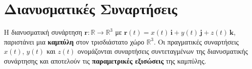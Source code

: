 



\geometry{left=15.63mm,right=15.63mm,top=30.25mm, bottom=36.25mm,footskip=24.16mm,
  headsep=24.16mm}

\pagestyle{vangelis}
\everymath{\displaystyle}

\newcommand{\twocolumnsidescc}[2]{\begin{minipage}[c]{0.40\linewidth}\raggedright
        #1
        \end{minipage}\hfill\begin{minipage}[c]{0.50\linewidth}\raggedright
        #2
    \end{minipage}
}



\chapter*{Διανυσματικές Συναρτήσεις}

\begin{dfn} Η διανυσματική συνάρτηση
  $ \mathbf{r} \colon \mathbb{R} \to \mathbb{R}^{3} $ με 
  $ \mathbf{r}(t) = x(t) \, \mathbf{i}+y(t) \, \mathbf{j}+z(t) \, \mathbf{k} $, 
  παριστάνει μια \textbf{καμπύλη} στον τρισδιάστατο χώρο $ \mathbb{R}^{3} $. 
  Οι πραγματικές συναρτήσεις $ x(t) $, $ y(t) $ και $ z(t) $ ονομάζονται
  \textcolor{Col1}{συναρτήσεις συντεταγμένων} της διανυσματικής συνάρτησης και αποτελούν 
  τις \textbf{παραμετρικές εξισώσεις} της καμπύλης.
\end{dfn}

